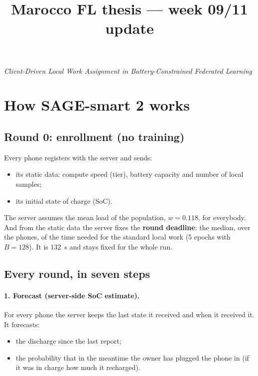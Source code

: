\documentclass[11pt,a4paper]{article}
\title{\bfseries Marocco FL thesis --- week 09/11 update}
\author{}
\date{}
\begin{document}
\maketitle
\vspace{-3.2em}
\begin{center}
\emph{Client-Driven Local Work Assignment in Battery-Constrained Federated Learning}
\end{center}
\vspace{1em}

\section{How SAGE-smart 2 works}
\label{sec:protocol}

\subsection{Round 0: enrollment (no training)}

Every phone registers with the server and sends:
\begin{itemize}
  \item its static data: compute speed (tier), battery capacity and number of
        local samples;
  \item its initial state of charge (SoC).
\end{itemize}
The server 
assumes the mean load of the population, $w = 0.118$, for everybody. And from the static data the server fixes the \textbf{round deadline}: the median,
over the phones, of the time needed for the standard local work (5 epochs with
$B = 128$). It is \SI{132}{s} and stays fixed for the whole run.

\subsection{Every round, in seven steps}

\paragraph{1. Forecast (server-side SoC estimate).}
For every phone the server keeps the last state it received and when it
received it. It forecasts:
\begin{itemize}
  \item the discharge since the last report;
  \item the probability that in the meantime the owner has plugged the phone in (if it was in charge how much it recharged).
\end{itemize}
\end{document}
